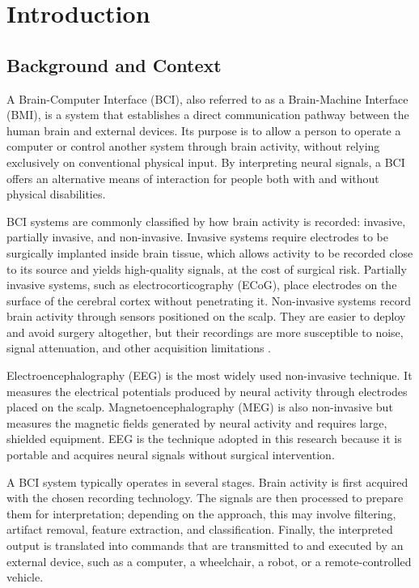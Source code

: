 \section{Introduction}

\subsection{Background and Context}

A Brain-Computer Interface (BCI), also referred to as a Brain-Machine Interface (BMI), is a system that establishes a direct communication pathway between the human brain and external devices. Its purpose is to allow a person to operate a computer or control another system through brain activity, without relying exclusively on conventional physical input. By interpreting neural signals, a BCI offers an alternative means of interaction for people both with and without physical disabilities.

BCI systems are commonly classified by how brain activity is recorded: invasive, partially invasive, and non-invasive. Invasive systems require electrodes to be surgically implanted inside brain tissue, which allows activity to be recorded close to its source and yields high-quality signals, at the cost of surgical risk. Partially invasive systems, such as electrocorticography (ECoG), place electrodes on the surface of the cerebral cortex without penetrating it. Non-invasive systems record brain activity through sensors positioned on the scalp. They are easier to deploy and avoid surgery altogether, but their recordings are more susceptible to noise, signal attenuation, and other acquisition limitations \citep{ramadan2015basics}.

Electroencephalography (EEG) is the most widely used non-invasive technique. It measures the electrical potentials produced by neural activity through electrodes placed on the scalp. Magnetoencephalography (MEG) is also non-invasive but measures the magnetic fields generated by neural activity and requires large, shielded equipment. EEG is the technique adopted in this research because it is portable and acquires neural signals without surgical intervention.

A BCI system typically operates in several stages. Brain activity is first acquired with the chosen recording technology. The signals are then processed to prepare them for interpretation; depending on the approach, this may involve filtering, artifact removal, feature extraction, and classification. Finally, the interpreted output is translated into commands that are transmitted to and executed by an external device, such as a computer, a wheelchair, a robot, or a remote-controlled vehicle.

